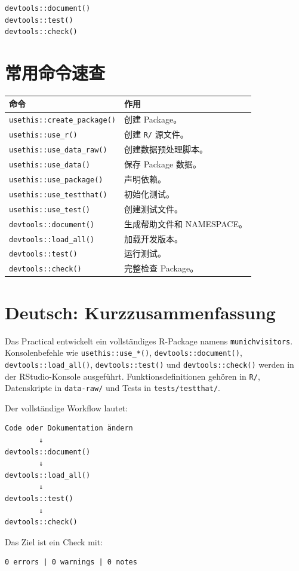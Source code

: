 \documentclass[11pt,a4paper]{ctexart}
\begin{document}
\begin{lstlisting}
devtools::document()
devtools::test()
devtools::check()
\end{lstlisting}

\section{常用命令速查}

\begin{longtable}{p{}p{}}
\toprule
命令 & 作用 \\
\midrule
\texttt{usethis::create\_package()} & 创建 Package。\\
\texttt{usethis::use\_r()} & 创建 \texttt{R/} 源文件。\\
\texttt{usethis::use\_data\_raw()} & 创建数据预处理脚本。\\
\texttt{usethis::use\_data()} & 保存 Package 数据。\\
\texttt{usethis::use\_package()} & 声明依赖。\\
\texttt{usethis::use\_testthat()} & 初始化测试。\\
\texttt{usethis::use\_test()} & 创建测试文件。\\
\texttt{devtools::document()} & 生成帮助文件和 NAMESPACE。\\
\texttt{devtools::load\_all()} & 加载开发版本。\\
\texttt{devtools::test()} & 运行测试。\\
\texttt{devtools::check()} & 完整检查 Package。\\
\bottomrule
\end{longtable}

\section{Deutsch: Kurzzusammenfassung}

Das Practical entwickelt ein vollständiges R-Package namens
\texttt{munichvisitors}. Konsolenbefehle wie
\texttt{usethis::use\_*()}, \texttt{devtools::document()},
\texttt{devtools::load\_all()}, \texttt{devtools::test()} und
\texttt{devtools::check()} werden in der RStudio-Konsole ausgeführt.
Funktionsdefinitionen gehören in \texttt{R/}, Datenskripte in
\texttt{data-raw/} und Tests in \texttt{tests/testthat/}.

Der vollständige Workflow lautet:

\begin{verbatim}
Code oder Dokumentation ändern
        ↓
devtools::document()
        ↓
devtools::load_all()
        ↓
devtools::test()
        ↓
devtools::check()
\end{verbatim}

Das Ziel ist ein Check mit:

\begin{verbatim}
0 errors | 0 warnings | 0 notes
\end{verbatim}
\end{document}
